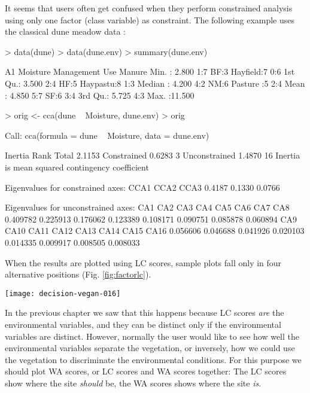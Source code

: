 \documentclass[a4paper,10pt]{amsart}
\begin{document}
It seems that users often get confused when they perform constrained
analysis using  only one factor (class variable) as constraint.  The
following example uses the classical dune meadow data \cite{Jongman87}:
\begin{Schunk}
\begin{Sinput}
> data(dune)
> data(dune.env)
> summary(dune.env)
\end{Sinput}
\begin{Soutput}
       A1         Moisture Management       Use    Manure
 Min.   : 2.800   1:7      BF:3       Hayfield:7   0:6   
 1st Qu.: 3.500   2:4      HF:5       Haypastu:8   1:3   
 Median : 4.200   4:2      NM:6       Pasture :5   2:4   
 Mean   : 4.850   5:7      SF:6                    3:4   
 3rd Qu.: 5.725                                    4:3   
 Max.   :11.500                                          
\end{Soutput}
\begin{Sinput}
> orig <- cca(dune ~ Moisture, dune.env)
> orig
\end{Sinput}
\begin{Soutput}
Call: cca(formula = dune ~ Moisture, data = dune.env)

              Inertia Rank
Total          2.1153     
Constrained    0.6283    3
Unconstrained  1.4870   16
Inertia is mean squared contingency coefficient 

Eigenvalues for constrained axes:
  CCA1   CCA2   CCA3 
0.4187 0.1330 0.0766 

Eigenvalues for unconstrained axes:
     CA1      CA2      CA3      CA4      CA5      CA6      CA7      CA8 
0.409782 0.225913 0.176062 0.123389 0.108171 0.090751 0.085878 0.060894 
     CA9     CA10     CA11     CA12     CA13     CA14     CA15     CA16 
0.056606 0.046688 0.041926 0.020103 0.014335 0.009917 0.008505 0.008033 
\end{Soutput}
\end{Schunk}
When the results are plotted using LC scores, sample plots fall only
in four alternative positions (Fig. \ref{fig:factorlc}).
\begin{SCfigure}
\texttt{[image: decision-vegan-016]}
\caption{LC scores of the dune meadow data using only one factor as a
  constraint.}
\label{fig:factorlc}
\end{SCfigure}
In the previous chapter we saw that this happens because LC scores
\emph{are} the environmental variables, and they can be distinct only
if the environmental variables are distinct.  However, normally the user
would like to see how well the environmental variables separate the
vegetation, or inversely, how we could use the vegetation to
discriminate the environmental conditions.  For this purpose we should
plot WA scores, or LC scores and WA scores together:  The LC scores
show where the site \emph{should} be, the WA scores shows where the
site \emph{is}.
\end{document}

